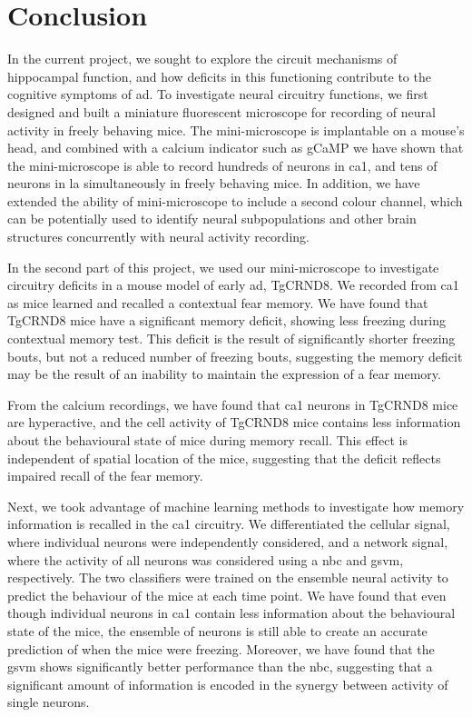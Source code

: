 \section{Conclusion}

In the current project, we sought to explore the circuit mechanisms of hippocampal function, and how deficits in this functioning contribute to the cognitive symptoms of \gls{ad}. To investigate neural circuitry functions, we first designed and built a miniature fluorescent microscope for recording of neural activity in freely behaving mice. The mini-microscope is implantable on a mouse's head, and combined with a calcium indicator such as gCaMP we have shown that the mini-microscope is able to record hundreds of neurons in \gls{ca1}, and tens of neurons in \gls{la} simultaneously in freely behaving mice. In addition, we have extended the ability of mini-microscope to include a second colour channel, which can be potentially used to identify neural subpopulations and other brain structures concurrently with neural activity recording.

In the second part of this project, we used our mini-microscope to investigate circuitry deficits in a mouse model of early \gls{ad}, TgCRND8. We recorded from \gls{ca1} as mice learned and recalled a contextual fear memory. We have found that TgCRND8 mice have a significant memory deficit, showing less freezing during contextual memory test. This deficit is the result of significantly shorter freezing bouts, but not a reduced number of freezing bouts, suggesting the memory deficit may be the result of an inability to maintain the expression of a fear memory.

From the calcium recordings, we have found that \gls{ca1} neurons in TgCRND8 mice are hyperactive, and the cell activity of TgCRND8 mice contains less information about the behavioural state of mice during memory recall.  This effect is independent of spatial location of the mice, suggesting that the deficit reflects impaired recall of the fear memory. 

Next, we took advantage of machine learning methods to investigate how memory information is recalled in the \gls{ca1} circuitry. We differentiated the cellular signal, where individual neurons were independently considered, and a network signal, where the activity of all neurons was considered using a \gls{nbc} and \gls{gsvm}, respectively. The two classifiers were trained on the ensemble neural activity to predict the behaviour of the mice at each time point. We have found that even though individual neurons in \gls{ca1} contain less information about the behavioural state of the mice, the ensemble of neurons is still able to create an accurate prediction of when the mice were freezing. Moreover, we have found that the \gls{gsvm} shows significantly better performance than the \gls{nbc}, suggesting that a significant amount of information is encoded in the synergy between activity of single neurons.

